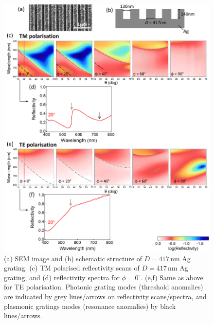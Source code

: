 \begin{figure}[h!] 
\centering    
\includegraphics[width=\textwidth]{Fig8}
\caption[(a) SEM image and (b) schematic structure of $D=417$\,nm Ag grating. Reflectivity measurements of Ag grating in (c,d) TM and (e.f) TE polarisation.]{(a) SEM image and (b) schematic structure of $D=417$\,nm Ag grating. (c) TM polarised reflectivity scans of $D=417$\,nm Ag grating, and (d) reflectivity spectra for $\phi=0^{\circ}$. (e,f) Same as above for TE polarisation. Photonic grating modes (threshold anomalies) are indicated by grey lines/arrows on reflectivity scans/spectra, and plasmonic gratings modes (resonance anomalies) by black lines/arrows.}
\label{7Fig8}
\end{figure}

